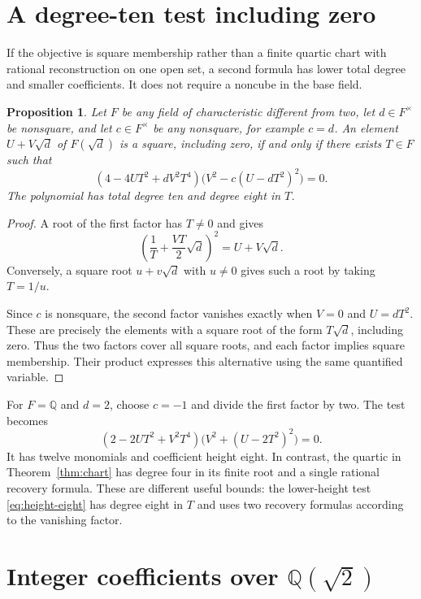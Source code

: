 \documentclass[11pt,a4paper]{article}
\newtheorem{proposition}[theorem]{Proposition}
\newcommand{\Q}{\mathbb Q}
\begin{document}
\section{A degree-ten test including zero}

If the objective is square membership rather than a finite quartic
chart with rational reconstruction on one open set, a second
formula has lower total degree and smaller coefficients. It does
not require a noncube in the base field.

\begin{proposition}\label{prop:low-height-test}
Let $F$ be any field of characteristic different from two, let
$d\in F^\times$ be nonsquare, and let
$c\in F^\times$ be any nonsquare, for example $c=d$.
An element $U+V\sqrt d$ of $F(\sqrt d)$ is a square, including
zero, if and only if there exists $T\in F$ such that
\begin{equation}\label{eq:low-height-test}
 (4-4UT^2+dV^2T^4)\bigl(V^2-c(U-dT^2)^2\bigr)=0.
\end{equation}
The polynomial has total degree ten and degree eight in $T$.
\end{proposition}
\begin{proof}
A root of the first factor has $T\ne0$ and gives
\[
 \left(\frac1T+\frac{VT}{2}\sqrt d\right)^2=U+V\sqrt d.
\]
Conversely, a square root $u+v\sqrt d$ with $u\ne0$ gives
such a root by taking $T=1/u$.

Since $c$ is nonsquare, the second factor vanishes exactly
when $V=0$ and $U=dT^2$. These are precisely the elements
with a square root of the form $T\sqrt d$, including zero.
Thus the two factors cover all square roots, and each factor
implies square membership. Their product expresses this
alternative using the same quantified variable.
\end{proof}

For $F=\Q$ and $d=2$, choose $c=-1$ and divide the first
factor by two. The test becomes
\begin{equation}\label{eq:height-eight}
        (2-2UT^2+V^2T^4)\bigl(V^2+(U-2T^2)^2\bigr)=0.
\end{equation}
It has twelve monomials and coefficient height eight.
In contrast, the quartic in Theorem~\ref{thm:chart} has
degree four in its finite root and a single rational recovery
formula. These are different useful bounds: the lower-height
test \eqref{eq:height-eight} has degree eight in $T$ and uses
two recovery formulas according to the vanishing factor.

\section{Integer coefficients over $\Q(\sqrt2)$}
\end{document}
